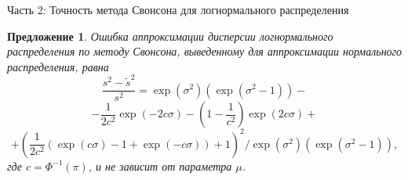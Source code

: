 \documentclass[ucs, notheorems, handout]{beamer}
\newtheorem{proposition2}[theorem]{Предложение}
\begin{document}
	\begin{frame}{Часть 2: Точность метода Свонсона для логнормального распределения}
		\begin{proposition2}\label{pr6}
			Ошибка аппроксимации дисперсии логнормального распределения по методу Свонсона, выведенному для аппроксимации нормального распределения, равна
			\[\dfrac{ s^{2} - \widetilde{s}^{2} }{s^{2}} = \exp(\sigma^{2})(\exp(\sigma^{2}-1)) -\]\[- \dfrac{1}{2c^{2}}\exp(-2c\sigma)- \left( 1- \dfrac{1}{c^{2}}\right) \exp(2c\sigma)+\]\[+ \left( \dfrac{1}{2c^{2}}(\exp(c\sigma)-1+\exp(-c\sigma)) + 1\right) ^{2} /\exp(\sigma^{2})(\exp(\sigma^{2}-1)),\]
			где $c = \Phi^{-1}(\pi)$, и не зависит от параметра $\mu$.
			
			
		\end{proposition2}
	
	\end{frame}
	
\end{document}
